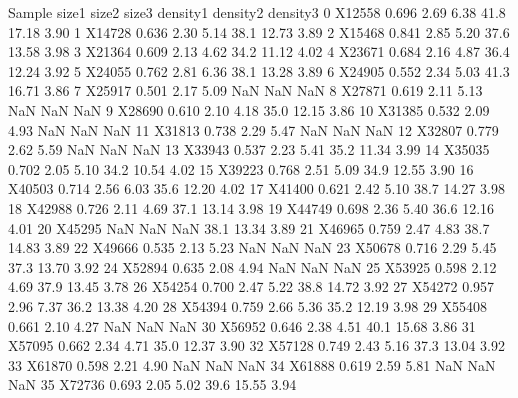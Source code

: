 \documentclass[letterpaper,10pt,english]{jupyterBook}
\begin{document}
\begin{sphinxVerbatim}[commandchars=\\\{\}]
  
\end{sphinxVerbatim}

\begin{sphinxVerbatim}[commandchars=\\\{\}]
    Sample  size1  size2  size3  density1  density2  density3
0   X12558  0.696   2.69   6.38      41.8     17.18      3.90
1   X14728  0.636   2.30   5.14      38.1     12.73      3.89
2   X15468  0.841   2.85   5.20      37.6     13.58      3.98
3   X21364  0.609   2.13   4.62      34.2     11.12      4.02
4   X23671  0.684   2.16   4.87      36.4     12.24      3.92
5   X24055  0.762   2.81   6.36      38.1     13.28      3.89
6   X24905  0.552   2.34   5.03      41.3     16.71      3.86
7   X25917  0.501   2.17   5.09       NaN       NaN       NaN
8   X27871  0.619   2.11   5.13       NaN       NaN       NaN
9   X28690  0.610   2.10   4.18      35.0     12.15      3.86
10  X31385  0.532   2.09   4.93       NaN       NaN       NaN
11  X31813  0.738   2.29   5.47       NaN       NaN       NaN
12  X32807  0.779   2.62   5.59       NaN       NaN       NaN
13  X33943  0.537   2.23   5.41      35.2     11.34      3.99
14  X35035  0.702   2.05   5.10      34.2     10.54      4.02
15  X39223  0.768   2.51   5.09      34.9     12.55      3.90
16  X40503  0.714   2.56   6.03      35.6     12.20      4.02
17  X41400  0.621   2.42   5.10      38.7     14.27      3.98
18  X42988  0.726   2.11   4.69      37.1     13.14      3.98
19  X44749  0.698   2.36   5.40      36.6     12.16      4.01
20  X45295    NaN    NaN    NaN      38.1     13.34      3.89
21  X46965  0.759   2.47   4.83      38.7     14.83      3.89
22  X49666  0.535   2.13   5.23       NaN       NaN       NaN
23  X50678  0.716   2.29   5.45      37.3     13.70      3.92
24  X52894  0.635   2.08   4.94       NaN       NaN       NaN
25  X53925  0.598   2.12   4.69      37.9     13.45      3.78
26  X54254  0.700   2.47   5.22      38.8     14.72      3.92
27  X54272  0.957   2.96   7.37      36.2     13.38      4.20
28  X54394  0.759   2.66   5.36      35.2     12.19      3.98
29  X55408  0.661   2.10   4.27       NaN       NaN       NaN
30  X56952  0.646   2.38   4.51      40.1     15.68      3.86
31  X57095  0.662   2.34   4.71      35.0     12.37      3.90
32  X57128  0.749   2.43   5.16      37.3     13.04      3.92
33  X61870  0.598   2.21   4.90       NaN       NaN       NaN
34  X61888  0.619   2.59   5.81       NaN       NaN       NaN
35  X72736  0.693   2.05   5.02      39.6     15.55      3.94
\end{sphinxVerbatim}
\end{document}
